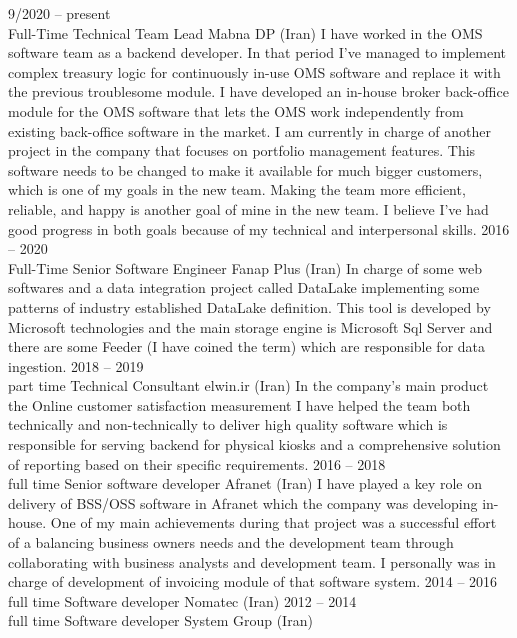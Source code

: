 \documentclass[9pt]{developercv} %
\begin{document}


\begin{entrylist}
	\entry
		{9/2020 -- present\\\footnotesize{Full-Time}}
		{Technical Team Lead}
		{Mabna DP (Iran)}
		{I have worked in the OMS software team as a backend developer. In that period I've managed to implement complex treasury logic for continuously in-use OMS software and replace it with the previous troublesome module. I have developed an in-house broker back-office module for the OMS software that lets the OMS work independently from existing back-office software in the market. I am currently in charge of another project in the company that focuses on portfolio management features. This software needs to be changed to make it available for much bigger customers, which is one of my goals in the new team. Making the team more efficient, reliable, and happy is another goal of mine in the new team. I believe I've had good progress in both goals because of my technical and interpersonal skills.}
	\entry
		{2016 -- 2020\\\footnotesize{Full-Time}}
		{Senior Software Engineer}
		{Fanap Plus (Iran)}
		{In charge of some web softwares and a data integration project called DataLake implementing some patterns of industry
established DataLake definition. This tool is developed by Microsoft technologies
and the main storage engine is Microsoft Sql Server and there are some Feeder (I have coined the term) which are responsible for data ingestion.}
	\entry
		{2018 -- 2019\\\footnotesize{part time}}
		{Technical Consultant}
		{elwin.ir (Iran)}
		{In the company’s main product the
Online customer satisfaction measurement I have helped the team both technically and non-technically to deliver high quality software which is
responsible for
serving backend for physical kiosks and a comprehensive solution of reporting based on their specific
requirements.}
	\entry
		{2016 -- 2018\\\footnotesize{full time}}
		{Senior software developer}
		{Afranet (Iran)}
		{I have played a key role on delivery of BSS/OSS software in Afranet
which the company was developing in-house. One of my main achievements during
that project was a successful effort of a balancing business owners needs and the
development team through collaborating with business analysts and development
team. I personally was in charge of development of invoicing module of that
software system.}
\entry
		{2014 -- 2016\\\footnotesize{full time}}
		{Software developer}
		{Nomatec (Iran)}
		{}
	\entry
		{2012 -- 2014\\\footnotesize{full time}}
		{Software developer}
		{System Group (Iran)}
		{}
\end{entrylist}
\end{document}
